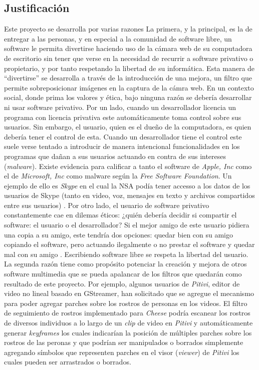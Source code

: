 \documentclass[a4paper,openright,12pt]{report}
\begin{document}
\subsection{Justificación}
Este proyecto se desarrolla por varias razones La primera, y la principal, es la
de entregar a las personas, y en especial a la comunidad de software libre, un
software le permita divertirse haciendo uso de la cámara web de su computadora
de escritorio sin tener que verse en la necesidad de recurrir a software
privativo o propietario, y por tanto respetando la libertad de su informática. Esta
manera de ``divertirse'' se desarrolla a través de la introducción de una mejora,
un filtro que permite sobreposicionar imágenes en la captura de la cámra web. En
un contexto social, donde prima los valores y ética, bajo ninguna razón se
debería desarrollar ni usar software privativo. Por un lado, cuando un
desarrollador licencia un programa con licencia privativa este automáticamente
toma control sobre sus usuarios. Sin embargo, el usuario, quien es el dueño de
la computadora, es quien debería tener el control de esta. Cuando un
desarrollador tiene el control este suele verse tentado a introducir de manera
intencional funcionalidades en los programas que dañan a sus usuarios actuando
en contra de sus intereses (\textit{malware}). Existe evidencia para calificar
a tanto el software de \textit{Apple, Inc} como el de \textit{Microsoft, Inc}
como malware \cite{malwareFSF} según la \textit{Free Software Foundation}.
Un ejemplo de ello es \textit{Skype} en el cual la NSA podía tener accesso a
los datos de los usuarios de Skype (tanto en video, voz, mensajes en texto y
archivos compartidos entre sus usuarios) \cite{skypeMalware}.
Por otro lado, el usuario de software privativo
constantemente cae en dilemas éticos: ¿quién debería decidir si compartir el
software: el usuario o el desarrollador? Si el mejor amigo de este usuario
pidiera una copia a su amigo, este tendría dos opciones: quedar bien con su
amigo copiando el software, pero actuando ilegalmente o no prestar el software
y quedar mal con su amigo \cite{patentesRMS}. Escribiendo software libre se
respeta la libertad del usuario. La segunda razón tiene como
propósito potenciar la creación y mejora de otros software multimedia que se
pueda apalancar de los filtros que quedarán como resultado de este proyecto.
Por ejemplo, algunos usuarios de \textit{Pitivi}, editor de video no lineal
basado en GStreamer, han solicitado que se agregue el mecanismo para poder
agregar parches sobre los rostros de personas en los videos. El filtro de
seguimiento de rostros implementado para \textit{Cheese} podría escanear los
rostros de diversos individuos a lo largo de un \textit{clip} de video en
\textit{Pitivi} y automáticamente generar \textit{keyframes} los cuales
indicarían la posición de múltiples parches sobre los rostros de las peronas y
que podrían ser manipulados o borrados simplemente agregando símbolos que
representen parches en el visor (\textit{viewer}) de \textit{Pitivi} los cuales
pueden ser arrastrados o borrados.
\end{document}
